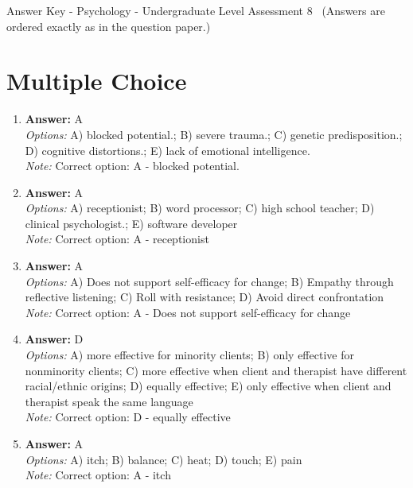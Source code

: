 \documentclass[12pt]{article}
\begin{document}
\begin{center}
Answer Key - Psychology - Undergraduate Level Assessment 8 \
\small (Answers are ordered exactly as in the question paper.)
\end{center}

\section*{Multiple Choice}
\begin{enumerate}[label=\arabic*.]
\item \textbf{Answer:} A
\\ \textit{Options:} A) blocked potential.; B) severe trauma.; C) genetic predisposition.; D) cognitive distortions.; E) lack of emotional intelligence.
\\ \textit{Note:} Correct option: A - blocked potential.
\item \textbf{Answer:} A
\\ \textit{Options:} A) receptionist; B) word processor; C) high school teacher; D) clinical psychologist.; E) software developer
\\ \textit{Note:} Correct option: A - receptionist
\item \textbf{Answer:} A
\\ \textit{Options:} A) Does not support self-efficacy for change; B) Empathy through reflective listening; C) Roll with resistance; D) Avoid direct confrontation
\\ \textit{Note:} Correct option: A - Does not support self-efficacy for change
\item \textbf{Answer:} D
\\ \textit{Options:} A) more effective for minority clients; B) only effective for nonminority clients; C) more effective when client and therapist have different racial/ethnic origins; D) equally effective; E) only effective when client and therapist speak the same language
\\ \textit{Note:} Correct option: D - equally effective
\item \textbf{Answer:} A
\\ \textit{Options:} A) itch; B) balance; C) heat; D) touch; E) pain
\\ \textit{Note:} Correct option: A - itch
\end{enumerate}
\end{document}
